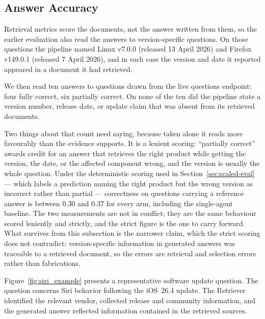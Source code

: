 \documentclass[acmsmall,review,anonymous,screen]{acmart}
\begin{document}
\subsection{Answer Accuracy}

Retrieval metrics score the documents, not the answer written from them, so
the earlier evaluation also read the answers to version-specific questions. On
those questions the pipeline named Linux v7.0.0 (released 13 April 2026) and
Firefox v149.0.1 (released 7 April 2026), and in each case the version and date
it reported appeared in a document it had retrieved.

We then read ten answers to questions drawn from the live questions endpoint:
four fully correct, six partially correct. On none of
the ten did the pipeline state a version number, release date, or update claim
that was absent from its retrieved documents.

Two things about that count need saying, because taken alone it reads more
favourably than the evidence supports. It is a lenient scoring: ``partially
correct'' awards credit for an answer that retrieves the right product while
getting the version, the date, or the affected component wrong, and the
version is usually the whole question. Under the deterministic scoring used in
Section~\ref{sec:scaled-eval} --- which labels a prediction naming the right
product but the wrong version as incorrect rather than partial --- correctness on
questions carrying a reference answer is between 0.30 and 0.37 for every arm,
including the single-agent baseline. The two measurements are not in conflict;
they are the same behaviour scored leniently and strictly, and the strict figure
is the one to carry forward. What survives from this subsection is the narrower
claim, which the strict scoring does not contradict: version-specific
information in generated answers was traceable to a retrieved document, so the
errors are retrieval and selection errors rather than fabrications.

Figure~\ref{fig:siri_example} presents a representative software update
question. The question concerns Siri behavior following the iOS~26.4
update. The Retriever identified the relevant vendor, collected
release and community information, and the generated answer reflected
information contained in the retrieved sources.
\end{document}
